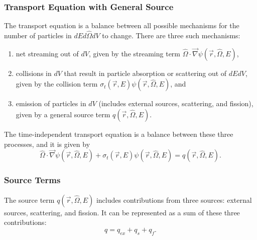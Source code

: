 \subsubsection{Transport Equation with General Source}
\label{sec:bg:rt:te:te}

The transport equation is a balance between all possible mechanisms for the number of particles in $dEd\hat{\Omega}dV$ to change.
There are three such mechanisms:
\begin{enumerate}
  \item net streaming out of $dV$, given by the streaming term $\hat{\Omega}\cdot\vec{\nabla}\psi\left(\vec{r},\hat{\Omega},E\right)$,
  \item collisions in $dV$ that result in particle absorption or scattering out of $dEdV$, given by the collision term $\sigma_t\left(\vec{r},E\right)\psi\left(\vec{r},\hat{\Omega},E\right)$, and
  \item emission of particles in $dV$ (includes external sources, scattering, and fission), given by a general source term $q\left(\vec{r},\hat{\Omega},E\right)$.
\end{enumerate}

The time-independent transport equation is a balance between these three processes, and it is given by
\begin{equation}\label{eq:bg:rt:transport-totsrc}
  \hat{\Omega}\cdot\vec{\nabla}\psi\left(\vec{r},\hat{\Omega},E\right) +
  \sigma_t\left(\vec{r},E\right)\psi\left(\vec{r},\hat{\Omega},E\right) =
  q\left(\vec{r},\hat{\Omega},E\right).
\end{equation}

\subsubsection{Source Terms}
\label{sec:bg:rt:te:st}

The source term $q\left(\vec{r},\hat{\Omega},E\right)$ includes contributions from three sources: external sources, scattering, and fission.
It can be represented as a sum of these three contributions:
\begin{equation}\label{eq:bg:rt:source}
  q = q_{ex} + q_s + q_f.
\end{equation}

